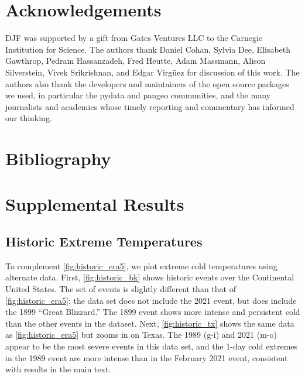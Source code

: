 \documentclass[12pt]{iopart}
\begin{document}
\section*{Acknowledgements}

DJF was supported by a gift from Gates Ventures LLC to the Carnegie Institution for Science.
The authors thank
Daniel Cohan,
Sylvia Dee,
Elisabeth Gawthrop,
Pedram Hassanzadeh,
Fred Heutte,
Adam Massmann,
Alison Silverstein,
Vivek Srikrishnan,
and
Edgar Virgüez
for discussion of this work.
The authors also thank the developers and maintainers of the open source packages we used, in particular the pydata and pangeo communities, and the many journalists and academics whose timely reporting and commentary has informed our thinking.

\section*{Bibliography}



\clearpage
\appendix
\section{Supplemental Results}
\renewcommand{\thefigure}{S\arabic{figure}}
\setcounter{figure}{0}

\subsection{Historic Extreme Temperatures}

To complement \cref{fig:historic_era5}, we plot extreme cold temperatures using alternate data.
First, \cref{fig:historic_bk} shows historic events over the Continental United States.
The set of events is slightly different than that of \cref{fig:historic_era5}: the data set does not include the 2021 event, but does include the 1899 ``Great Blizzard.''
The 1899 event shows more intense and persistent cold than the other events in the dataset.
Next, \cref{fig:historic_tx} shows the same data as \cref{fig:historic_era5} but zooms in on Texas.
The 1989 (g-i) and 2021 (m-o) appear to be the most severe events in this data set, and the 1-day cold extremes in the 1989 event are more intense than in the February 2021 event, consistent with results in the main text.
\end{document}
